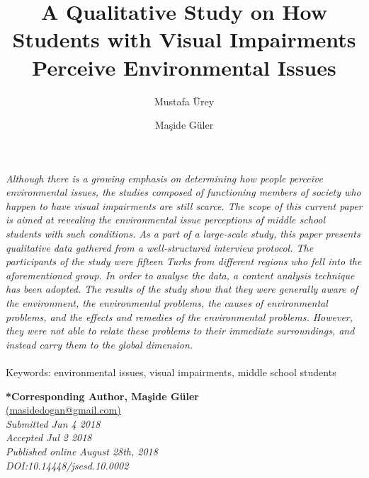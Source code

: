 \documentclass[11.5pt]{sig-alternate} %
\makeatletter
\let\oldabstract\abstract
\let\oldendabstract\endabstract
\renewenvironment{abstract} %
{\renewenvironment{quotation}%
               {\list{}{\addtolength{\leftmargin}{1em} %
                        \listparindent 1.5em%
                        \itemindent    \listparindent%
                        \rightmargin   \leftmargin%
                        \parsep        \z@ \@plus\p@}%
                \item\relax}%
               {\endlist}%
\oldabstract}
{\oldendabstract}
\makeatother
\begin{document}
\title{A Qualitative Study on How Students with Visual Impairments Perceive Environmental Issues}

\author[1]{\large \color{blue}Mustafa Ürey}
\author[1]{\large \color{blue}Maşide Güler}

\toappear{}
\maketitle
\begin{@twocolumnfalse} 
\begin{abstract}
\item 
\textit {Although there is a growing emphasis on determining how people perceive environmental issues, the studies composed of functioning members of society who happen to have visual impairments are still scarce. The scope of this current paper is aimed at revealing the environmental issue perceptions of middle school students with such conditions. As a part of a large-scale study, this paper presents qualitative data gathered from a well-structured interview protocol. The participants of the study were fifteen Turks from different regions who fell into the aforementioned group. In order to analyse the data, a content analysis technique has been adopted. The results of the study show that they were generally aware of the environment, the environmental problems, the causes of environmental problems, and the effects and remedies of the environmental problems. However, they were not able to relate these problems to their immediate surroundings, and instead carry them to the global dimension.}
\\ \\
Keywords:  environmental issues, visual impairments, middle school students
\end{abstract}
\end{@twocolumnfalse}


\textbf{*Corresponding Author, Maşide Güler}\\
\href{mailto: masidedogan@gmail.com }{(masidedogan@gmail.com)} \\
\textit{Submitted Jun 4 2018 }\\
\textit{Accepted Jul 2 2018} \\
\textit{Published online August 28th, 2018} \\
\textit{DOI:10.14448/jsesd.10.0002} \\
\pagebreak
\clearpage
\end{document}
